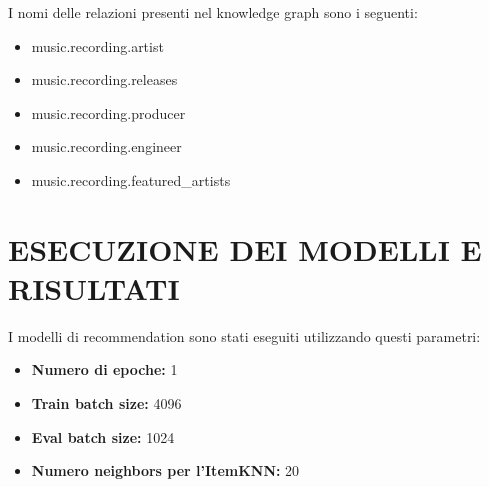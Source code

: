 \noindent I nomi delle relazioni presenti nel knowledge graph sono i seguenti:
\begin{itemize}
    \item music.recording.artist
    \item music.recording.releases
    \item music.recording.producer
    \item music.recording.engineer
    \item music.recording.featured\_artists
\end{itemize}


\newpage

\section*{ESECUZIONE DEI MODELLI E RISULTATI}

I modelli di recommendation sono stati eseguiti utilizzando questi parametri:
\begin{itemize}
    \item \textbf{Numero di epoche:} 1
    \item \textbf{Train batch size:} 4096
    \item \textbf{Eval batch size:} 1024
    \item \textbf{Numero neighbors per l'ItemKNN:} 20
\end{itemize}


